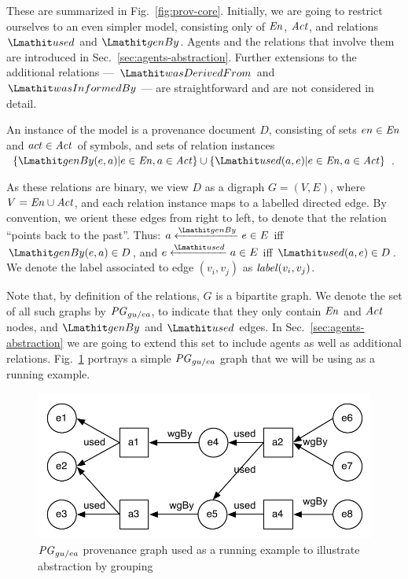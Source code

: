 These are summarized in Fig.~\ref{fig:prov-core}.
%
Initially, we are going to restrict ourselves to an even simpler model, consisting only of $\mathit{En}$, $\mathit{Act}$, and relations $\used$ and $\wgby$. Agents and the relations that involve them are introduced in Sec.~\ref{sec:agents-abstraction}.
%
Further extensions to the additional relations --- $\wdf$ and $\wasInfBy$ --- are straightforward and are not considered in detail.

%
An instance  of the model is a provenance document $D$, consisting of sets $en \in \mathit{En}$ and $act \in \mathit{Act}$ of symbols, and sets of relation instances $\{ \wgby(e,a)  | e \in \en, a \in \act \} \cup   \{ \used(a,e)  | e \in \en, a \in \act\}$. 

%
As these relations are binary, we view $D$ as a digraph $G=(V,E)$, where $V= \mathit{En} \cup \mathit{Act}$, and each relation instance maps to a labelled directed edge. By convention, we orient these edges from right to left, to denote that the relation ``points back to the past''. Thus:
$a \xleftarrow{\wgby} e \in E$ iff $\wgby(e,a) \in D$, and $e \xleftarrow{\used} a \in E$ iff $\used(a,e) \in D$.
%
We denote the label associated to edge $(v_i, v_j)$ as $\mathit{label}(v_i,v_j)$. 

%
Note that, by definition of the relations, $G$ is a bipartite graph.
We denote the set of all such graphs by $\mathit{PG}_{gu/ea}$, to indicate that they only contain $\mathit{En}$ and $\mathit{Act}$ nodes, and $\wgby$ and $\used$ edges. In Sec.~\ref{sec:agents-abstraction} we are going to extend this set to include agents as well as additional relations.
Fig.~\ref{fig:baseline-ug-ae} portrays a simple $\mathit{PG}_{gu/ea}$ graph that we will be using as a running example.

\begin{figure}
\centering
\includegraphics[scale=.6]{figures/baseline-ug-ae.pdf} 
\caption{$\mathit{PG}_{gu/ea}$ provenance graph used as a running example to illustrate abstraction by grouping}  \label{fig:baseline-ug-ae}
\end{figure}

